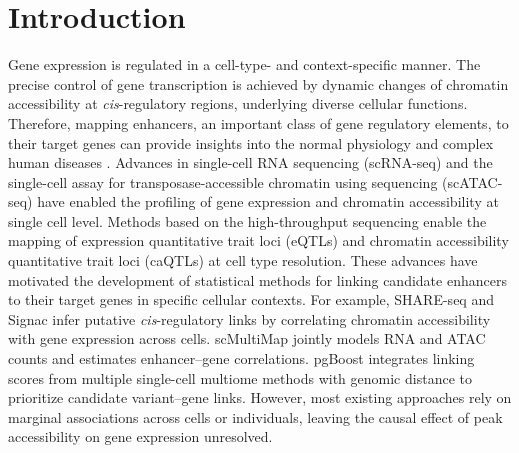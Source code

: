 \section{Introduction}
\label{sec:introduction}

Gene expression is regulated in a cell-type- and context-specific manner. The precise control of gene transcription is achieved by dynamic changes of chromatin accessibility at \textit{cis}-regulatory regions, underlying diverse cellular functions. Therefore, mapping enhancers, an important class of gene regulatory elements, to their target genes can provide insights into the normal physiology and complex human diseases \cite{gasperini2020enhancers}. 
Advances in single-cell RNA sequencing (scRNA-seq) and the single-cell assay for transposase-accessible chromatin using sequencing (scATAC-seq) have enabled the profiling of gene expression and chromatin accessibility at single cell level. Methods based on the high-throughput sequencing enable the mapping of expression quantitative trait loci (eQTLs) and chromatin accessibility quantitative trait loci (caQTLs) at cell type resolution. These advances have motivated the development of statistical methods for linking candidate enhancers to their target genes in specific cellular contexts. For example, SHARE-seq \cite{ma2020shareseq} and Signac \cite{stuart2021signac} infer putative \textit{cis}-regulatory links by correlating chromatin accessibility with gene expression across cells. scMultiMap \cite{su2025scmultimap} jointly models RNA and ATAC counts and estimates enhancer--gene correlations. pgBoost \cite{dorans2025pgboost} integrates linking scores from multiple single-cell multiome methods with genomic distance to prioritize candidate variant--gene links. However, most existing approaches rely on marginal associations across cells or individuals, leaving the causal effect of peak accessibility on gene expression unresolved.

